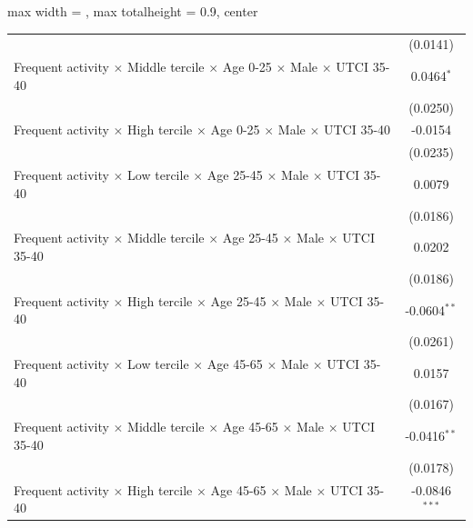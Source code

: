 \begin{table}[htbp]
\begin{adjustbox}{max width = \textwidth, max totalheight = 0.9\textheight, center}
\begin{tabular}{lc}
                                                                                                               & (0.0141)\\   
         Frequent activity $\times$ Middle tercile $\times$ Age 0-25 $\times$ Male $\times$ UTCI 35-40         & 0.0464$^{*}$\\   
                                                                                                               & (0.0250)\\   
         Frequent activity $\times$ High tercile $\times$ Age 0-25 $\times$ Male $\times$ UTCI 35-40           & -0.0154\\   
                                                                                                               & (0.0235)\\   
         Frequent activity $\times$ Low tercile $\times$ Age 25-45 $\times$ Male $\times$ UTCI 35-40           & 0.0079\\   
                                                                                                               & (0.0186)\\   
         Frequent activity $\times$ Middle tercile $\times$ Age 25-45 $\times$ Male $\times$ UTCI 35-40        & 0.0202\\   
                                                                                                               & (0.0186)\\   
         Frequent activity $\times$ High tercile $\times$ Age 25-45 $\times$ Male $\times$ UTCI 35-40          & -0.0604$^{**}$\\   
                                                                                                               & (0.0261)\\   
         Frequent activity $\times$ Low tercile $\times$ Age 45-65 $\times$ Male $\times$ UTCI 35-40           & 0.0157\\   
                                                                                                               & (0.0167)\\   
         Frequent activity $\times$ Middle tercile $\times$ Age 45-65 $\times$ Male $\times$ UTCI 35-40        & -0.0416$^{**}$\\   
                                                                                                               & (0.0178)\\   
         Frequent activity $\times$ High tercile $\times$ Age 45-65 $\times$ Male $\times$ UTCI 35-40          & -0.0846$^{***}$\\   

\end{tabular}
\end{adjustbox}
\end{table}
